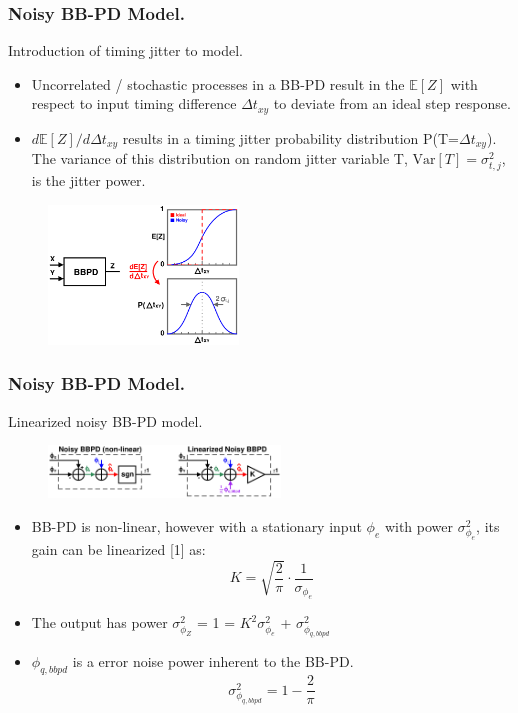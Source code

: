 \documentclass[t, screen, aspectratio=43]{beamer}
\begin{document}
\begin{frame}
	\frametitle{Noisy BB-PD Model.}
	\begin{block}{Introduction of timing jitter to model.}
	\tiny
	\begin{itemize}[itemsep=4pt,label=\protect---]
		\item Uncorrelated / stochastic processes in a BB-PD result in the $\mathbb{E}[Z]$ with respect to input timing difference $\Delta t_{xy}$ to deviate from an ideal step response.
		\item $d\mathbb{E}[Z]/d\Delta t_{xy}$ results in a timing jitter probability distribution P(T=$\Delta t_{xy}$). The variance of this distribution on random jitter variable T, $\mathrm{Var}[T] = \sigma_{t,j}^2$, is the jitter power.
	\end{itemize}

	\begin{figure}[htb!]
	    \centering
		\includegraphics[width=0.45\textwidth, angle=0]{bbpd_jitter.pdf}
	\end{figure}
	\end{block}	
\end{frame}

\begin{frame}
	\frametitle{Noisy BB-PD Model.}
	\begin{block}{Linearized noisy BB-PD model.}
	\tiny
	\begin{figure}[htb!]
	    \centering
		\includegraphics[width=0.55\textwidth, angle=0]{bbpd_noise_linearized.pdf}
	\end{figure}
	\begin{itemize}[itemsep=4pt,label=\protect---]
		\item BB-PD is non-linear, however with a stationary input $\phi_e$ with power  $\sigma^2_{\phi_e}$, its gain can be linearized [1] as:
		\tiny
		\begin{equation}
			K = \sqrt{\frac{2}{\pi}}\cdot\frac{1}{\sigma_{\phi_e}}
		\end{equation}
		\item The output has power $\sigma^2_{\phi_Z}$ = 1 = $K^2\sigma^2_{\phi_e}$ + $\sigma^2_{\phi_{q,bbpd}}$
		\item $\phi_{q,bbpd}$ is a error noise power inherent to the BB-PD. 
		\begin{equation}
			\sigma^2_{\phi_{q,bbpd}} = 1 - \frac{2}{\pi}
		\end{equation}
	\end{itemize}

	\end{block}	
\end{frame}
\end{document}
